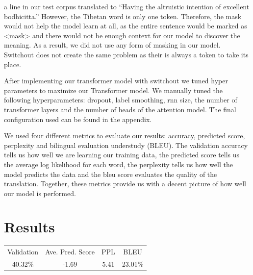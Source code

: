 \documentclass[letterpaper, 12 pt, conference]{ieeeconf}  %
\begin{document}
a line in our test corpus translated to “Having the altruistic intention of excellent bodhicitta.” However, the Tibetan word is only one token. Therefore, the mask would not help the model learn at all, as the entire sentence would be marked as <mask> and there would not be enough context for our model to discover the meaning. As a result, we did not use any form of masking in our model. Switchout does not create the same problem as their is always a token to take its place. \par
After implementing our transformer model with switchout we tuned hyper parameters to maximize our Transformer model. We manually tuned the following hyperparameters: dropout, label smoothing, rnn size, the number of transformer layers and the number of heads of the attention model. The final configuration used can be found in the appendix. \par
We used four different metrics to evaluate our results: accuracy, predicted score, perplexity and bilingual evaluation understudy (BLEU). The validation accuracy tells us how well we are learning our training data, the predicted score tells us the average log likelihood for each word, the perplexity tells us how well the model predicts the data and the bleu score evaluates the quality of the translation. Together, these metrics provide us with a decent picture of how well our model is performed. 

\section{Results}
\begin{tabular}{ |c| c| c| c| }
 Validation & Ave. Pred. Score & PPL & BLEU \\ 
 40.32\% & -1.69 & 5.41 & 23.01\% \\

\end{tabular}\\
\end{document}
